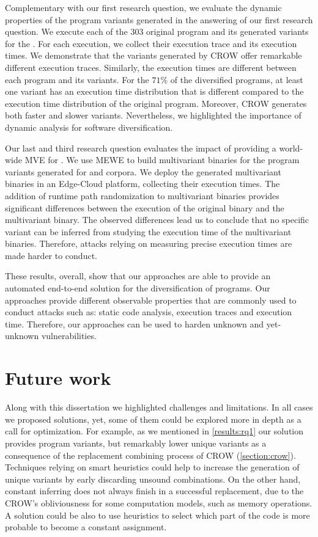Complementary with our first research question, we evaluate the dynamic properties of the program variants generated in the answering of our first research question.
We execute each of the 303 original program and its generated variants for the \corpusrosetta.
For each execution, we collect their execution trace and its execution times.
We demonstrate that the \wasm variants generated by CROW offer remarkable different execution traces.
Similarly, the execution times are different between each program and its variants.
For the $71\%$ of the diversified programs, at least one variant has an execution time distribution that is different compared to the execution time distribution of the original program.
Moreover, CROW generates both faster and slower variants.
Nevertheless, we highlighted the importance of dynamic analysis for software diversification. 

Our last and third research question evaluates the impact of providing a world-wide MVE for \wasm.
We use MEWE to build multivariant binaries for the program variants generated for \corpussodium and \corpusqrcode corpora.
We deploy the generated multivariant binaries in an Edge-Cloud platform, collecting their execution times.
The addition of runtime path randomization to multivariant binaries provides significant differences between the execution of the original binary and the multivariant binary.
The observed differences lead us to conclude that no specific variant can be inferred from studying the execution time of the multivariant binaries. Therefore, attacks relying on measuring precise execution times are made harder to conduct.


These results, overall, show that our approaches are able to provide an automated end-to-end solution for the diversification of \wasm programs. 
Our approaches provide different observable properties that are commonly used to conduct attacks such as: static code analysis, execution traces and execution time.
Therefore, our approaches can be used to harden unknown and yet-unknown vulnerabilities.

\section{Future work}
\label{future_work}

Along with this dissertation we highlighted challenges and limitations. In all cases we proposed solutions, yet, some of them could be explored more in depth as a call for optimization. For example,
as we mentioned in \autoref{results:rq1} our solution provides program variants, but remarkably lower unique variants as a consequence of the replacement combining process of CROW (\autoref{section:crow}). 
Techniques relying on smart heuristics \citationneeded could help to increase the generation of unique variants by early discarding unsound combinations.
On the other hand, constant inferring does not always finish in a successful replacement, due to the CROW's obliviousness for some computation models, such as memory operations. 
A solution could be also to use heuristics to select which part of the code is more probable to become a constant assignment.

